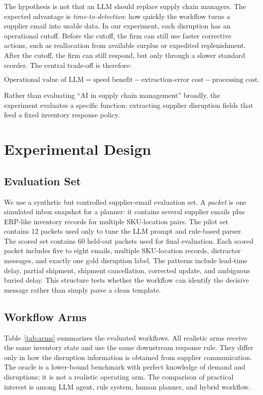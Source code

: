 \documentclass[11pt]{article}
\begin{document}
The hypothesis is not that an LLM should replace supply chain managers. The expected advantage is \emph{time-to-detection}: how quickly the workflow turns a supplier email into usable data. In our experiment, each disruption has an operational cutoff. Before the cutoff, the firm can still use faster corrective actions, such as reallocation from available surplus or expedited replenishment. After the cutoff, the firm can still respond, but only through a slower standard reorder. The central trade-off is therefore:

\begin{equation}
\text{Operational value of LLM} =
\text{speed benefit} - \text{extraction-error cost} - \text{processing cost}.
\end{equation}

Rather than evaluating ``AI in supply chain management'' broadly, the experiment evaluates a specific function: extracting supplier disruption fields that feed a fixed inventory response policy.

\section{Experimental Design}

\subsection{Evaluation Set}

We use a synthetic but controlled supplier-email evaluation set. A \emph{packet} is one simulated inbox snapshot for a planner: it contains several supplier emails plus ERP-like inventory records for multiple SKU-location pairs. The pilot set contains 12 packets used only to tune the LLM prompt and rule-based parser. The scored set contains 60 held-out packets used for final evaluation. Each scored packet includes five to eight emails, multiple SKU-location records, distractor messages, and exactly one gold disruption label. The patterns include lead-time delay, partial shipment, shipment cancellation, corrected update, and ambiguous buried delay. This structure tests whether the workflow can identify the decisive message rather than simply parse a clean template.

\subsection{Workflow Arms}

Table~\ref{tab:arms} summarizes the evaluated workflows. All realistic arms receive the same inventory state and use the same downstream response rule. They differ only in how the disruption information is obtained from supplier communication. The oracle is a lower-bound benchmark with perfect knowledge of demand and disruptions; it is not a realistic operating arm. The comparison of practical interest is among LLM agent, rule system, human planner, and hybrid workflow.
\end{document}

